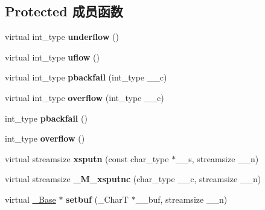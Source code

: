 \subsection*{Protected 成员函数}
\begin{DoxyCompactItemize}
\item 
\mbox{\label{classbasic__stringbuf_a25431832e0ac4815a2cec39708c187de}} 
virtual int\+\_\+type {\bfseries underflow} ()
\item 
\mbox{\label{classbasic__stringbuf_a5204c467d029da142d8e48f03d2776fc}} 
virtual int\+\_\+type {\bfseries uflow} ()
\item 
\mbox{\label{classbasic__stringbuf_acc0bce43aa54460c74abb3ce77344395}} 
virtual int\+\_\+type {\bfseries pbackfail} (int\+\_\+type \+\_\+\+\_\+c)
\item 
\mbox{\label{classbasic__stringbuf_ac01816c178511c9de337991cf919ac78}} 
virtual int\+\_\+type {\bfseries overflow} (int\+\_\+type \+\_\+\+\_\+c)
\item 
\mbox{\label{classbasic__stringbuf_a813cb777b6e03992bdab16bbb5fb312f}} 
int\+\_\+type {\bfseries pbackfail} ()
\item 
\mbox{\label{classbasic__stringbuf_aa576230bba2ebc7b333aa6235d310556}} 
int\+\_\+type {\bfseries overflow} ()
\item 
\mbox{\label{classbasic__stringbuf_ac4fe57e793decce1041fd31ee6db09b3}} 
virtual streamsize {\bfseries xsputn} (const char\+\_\+type $\ast$\+\_\+\+\_\+s, streamsize \+\_\+\+\_\+n)
\item 
\mbox{\label{classbasic__stringbuf_a0557a383c55cc00966e818c982a0e8bc}} 
virtual streamsize {\bfseries \+\_\+\+M\+\_\+xsputnc} (char\+\_\+type \+\_\+\+\_\+c, streamsize \+\_\+\+\_\+n)
\item 
\mbox{\label{classbasic__stringbuf_a04d9f258b8e3f28d1aa8b1a44f55553c}} 
virtual \hyperlink{classbasic__streambuf}{\+\_\+\+Base} $\ast$ {\bfseries setbuf} (\+\_\+\+CharT $\ast$\+\_\+\+\_\+buf, streamsize \+\_\+\+\_\+n)

\end{DoxyCompactItemize}
